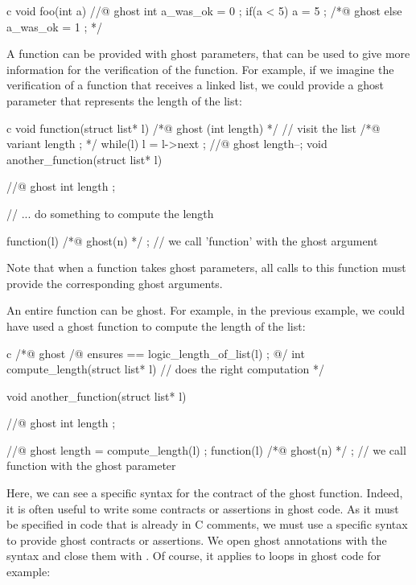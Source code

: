 \begin{CodeBlock}{c}
void foo(int a){
  //@ ghost int a_was_ok = 0 ;
  if(a < 5){
    a = 5 ;
  } /*@ ghost else {
    a_was_ok = 1 ;
  } */
}
\end{CodeBlock}


A function can be provided with ghost parameters, that can be used
to give more information for the verification of the function. For
example, if we imagine the verification of a function that receives
a linked list, we could provide a ghost parameter that represents
the length of the list:


\begin{CodeBlock}{c}
void function(struct list* l) /*@ ghost (int length) */ {
  // visit the list
  /*@ variant length ; */
  while(l){
    l = l->next ;
    //@ ghost length--;
  }
}
void another_function(struct list* l){
  //@ ghost int length ;

  // ... do something to compute the length

  function(l) /*@ ghost(n) */ ; // we call 'function' with the ghost argument
}
\end{CodeBlock}


Note that when a function takes ghost parameters, all calls to this
function must provide the corresponding ghost arguments.


An entire function can be ghost. For example, in the previous example, we
could have used a ghost function to compute the length of the list:


\begin{CodeBlock}{c}
/*@ ghost
  /@ ensures \result == logic_length_of_list(l) ; @/
  int compute_length(struct list* l){
    // does the right computation
  }
*/

void another_function(struct list* l){
  //@ ghost int length ;

  //@ ghost length = compute_length(l) ;
  function(l) /*@ ghost(n) */ ; // we call function with the ghost parameter
}
\end{CodeBlock}


Here, we can see a specific syntax for the contract of the ghost function.
Indeed, it is often useful to write some contracts or assertions in ghost
code. As it must be specified in code that is already in C comments, we
must use a specific syntax to provide ghost contracts or assertions.
We open ghost annotations with the syntax  and close
them with . Of course, it applies to loops in ghost code
for example:


